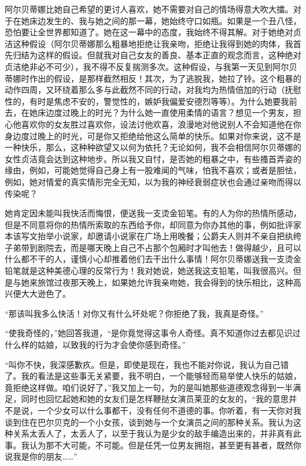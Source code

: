 \par 阿尔贝蒂娜比她自己希望的更讨人喜欢，她不需要对自己的情场得意大吹大擂。对于在她床边发生的、我与她之间的那一幕，她始终守口如瓶。如果是一个丑八怪，恐怕要让全世界都知道了。她在这一幕中的态度，我始终不得其解。对于她绝对贞洁这种假设（阿尔贝蒂娜那么粗暴地拒绝让我亲吻，拒绝让我得到她的肉体，我首先归结为这样的假设。但就我对自己女友的善良、基本正直的观念而言，这种绝对贞洁绝非必不可少），我不得不反复揣测多次。这种假设，与我第一天见到阿尔贝蒂娜时作出的假设，是那样截然相反！其次，为了逃脱我，她拉了铃。这个粗暴的动作四周，又环绕着那么多与此截然不同的行动，对我均为热情倍加的行动（抚慰性的，有时是焦虑不安的，警觉性的，嫉妒我偏爱安德烈等等）。为什么她要我前去，在她床边度过晚上的时光？为什么她一直使用柔情的语言？想见一个男友，担心他喜欢你的女友胜过喜欢你，设法讨他欢喜，浪漫地对他说别人不会知道他在你身边度过晚上的时光，可是你又拒绝给他这么简单的快乐。如果对你来说，这不是一种快乐，那么，这种种欲望又以何为依托？无论如何，我不会相信阿尔贝蒂娜的女性贞洁竟会达到这种地步。所以我又自忖，是否她的粗暴之中，有些搔首弄姿的缘由，例如，可能她觉得自己身上有一股难闻的气味，怕我不喜欢；或者是胆怯，例如，她对情爱的真实情形完全无知，以为我的神经衰弱症状也会通过亲吻而得以传染呢？
\par 她肯定因未能叫我快活而悔恨，便送我一支烫金铅笔。有的人为你的热情所感动，但是不同意将你的热情所索取的东西给予你，却同意为你办其他的事，例如批评家本该写文抬举小说家，却邀请小说家在广场上用晚餐；公爵夫人则并不亲自把纨绔子弟带到剧院去，而是哪天晚上自己不占那个包厢时才叫他去！做得越少，且可以什么都不干的人，谨慎小心却推着他们去干出什么事情！阿尔贝蒂娜送我一支烫金铅笔就是这种美德心理的反常行为！我对她说，她送我这支铅笔，叫我很高兴。但是与她来旅馆过夜那天晚上，如果她允许我亲吻她，我会得到的快乐相比，这种高兴便大大逊色了。
\par “那该叫我多么快活！对你又有什么坏处呢？你拒绝了我，我真是奇怪。”
\par “使我奇怪的，”她回答我道，“是你竟觉得这事令人奇怪。真不知道你过去都见识过什么样的姑娘，以致我的行为才会使你感到奇怪。”
\par “叫你不快，我深感歉疚。但是，即使是现在，我也不能对你说，我认为自己错了。我的看法是这些事无关紧要，我不明白，一个能够轻而易举使人快乐的姑娘，竟拒绝这样做。咱们说好了，”我又加上一句，为的是叫她那些道德观念得到一半满足，同时也回忆起她和她的女友们是怎样鞭挞女演员莱亚的女友的，“我的意思并不是说，一个少女可以什么事都干，没有任何不道德的事。你听着，有一天你对我谈到住在巴尔贝克的一个小女孩，谈到她与一个女演员之间的那种关系。我认为这种关系太丢人了，太丢人了，以至于我认为是少女的敌手编造出来的，并非真有此事。我认为那不大可能，不可能。但是任凭一位男友拥抱，甚至更有甚者，既然你说我是你的朋友……”
